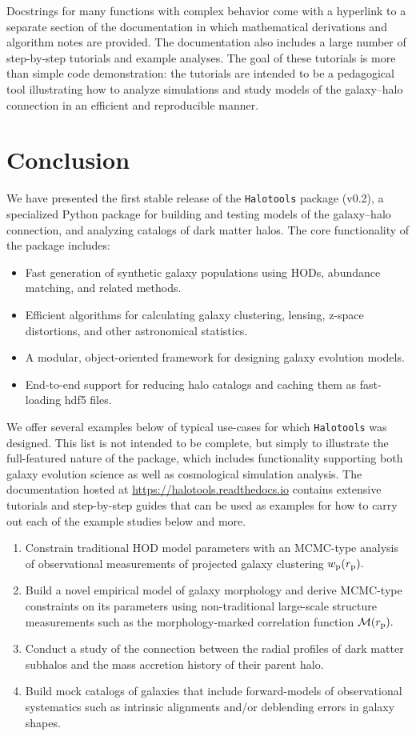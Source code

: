 \documentclass[twocolumn, tighten]{aastex6}
\newcommand{\ben}{\begin{enumerate}}
\newcommand{\een}{\end{enumerate}}
\newcommand{\bit}{\begin{itemize}}
\newcommand{\eit}{\end{itemize}}
\newcommand{\rproj}{r_{\rm p}}
\begin{document}
Docstrings for many functions with complex behavior come with a hyperlink to a separate section of the documentation in which mathematical derivations and algorithm notes are provided. The documentation also includes a large number of step-by-step tutorials and example analyses. The goal of these tutorials is more than simple code demonstration: the tutorials are intended to be a pedagogical tool illustrating how to analyze simulations and study models of the galaxy--halo connection in an efficient and reproducible manner.

\section{Conclusion}
\label{section:conclusion}

We have presented the first stable release of the {\tt Halotools} package (v0.2), a specialized Python package for building and testing models of the galaxy--halo connection, and analyzing catalogs of dark matter halos. The core functionality of the package includes:

\bit
\item Fast generation of synthetic galaxy populations using HODs, abundance matching, and related methods.
\item Efficient algorithms for calculating galaxy clustering, lensing, z-space distortions, and other astronomical statistics.
\item A modular, object-oriented framework for designing galaxy evolution models.
\item End-to-end support for reducing halo catalogs and caching them as fast-loading hdf5 files.
\eit

We offer several examples below of typical use-cases for which {\tt Halotools} was designed. This list is not intended to be complete, but simply to illustrate the full-featured nature of the package, which includes functionality supporting both galaxy evolution science as well as cosmological simulation analysis. The documentation hosted at \url{https://halotools.readthedocs.io} contains extensive tutorials and step-by-step guides that can be used as examples for how to carry out each of the example studies below and more.

\ben
\item Constrain traditional HOD model parameters with an MCMC-type analysis of observational measurements of projected galaxy clustering $w_{\rm p}(\rproj).$
\item Build a novel empirical model of galaxy morphology and derive MCMC-type constraints on its parameters using non-traditional large-scale structure measurements such as the morphology-marked correlation function $\mathcal{M}(\rproj).$
\item Conduct a study of the connection between the radial profiles of dark matter subhalos and the mass accretion history of their parent halo.
\item Build mock catalogs of galaxies that include forward-models of observational systematics such as intrinsic alignments and/or deblending errors in galaxy shapes.
\een
\end{document}
